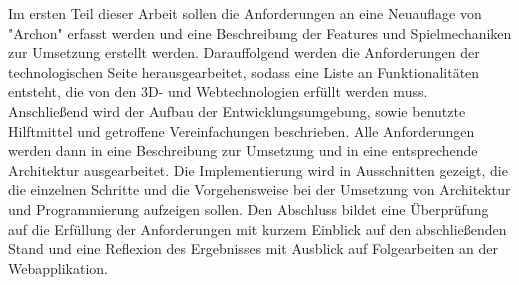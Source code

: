 Im ersten Teil dieser Arbeit sollen die Anforderungen an eine Neuauflage von "Archon" erfasst werden und eine Beschreibung der Features und Spielmechaniken zur Umsetzung erstellt werden.
Darauffolgend werden die Anforderungen der technologischen Seite herausgearbeitet, sodass eine Liste an Funktionalitäten entsteht, die von den 3D- und Webtechnologien erfüllt werden muss.
Anschließend wird der Aufbau der Entwicklungsumgebung, sowie benutzte Hilftmittel und getroffene Vereinfachungen beschrieben.
Alle Anforderungen werden dann in eine Beschreibung zur Umsetzung und in eine entsprechende Architektur ausgearbeitet.
Die Implementierung wird in Ausschnitten gezeigt, die die einzelnen Schritte und die Vorgehensweise bei der Umsetzung von Architektur und Programmierung aufzeigen sollen.
Den Abschluss bildet eine Überprüfung auf die Erfüllung der Anforderungen mit kurzem Einblick auf den abschließenden Stand und eine Reflexion des Ergebnisses mit Ausblick auf Folgearbeiten an der Webapplikation.